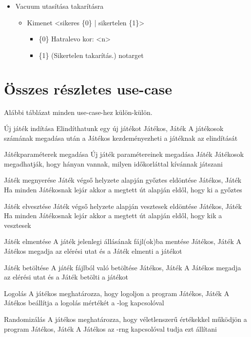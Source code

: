 \begin{itemize}
	\item Vacuum utasítása takarításra
	\begin{itemize}
		\item Kimenet <sikeres \{0\} | sikertelen \{1\}>
		\begin{itemize}
			\item \{0\} Hatralevo kor: <n>
			\item \{1\} (Sikertelen takarítás.) notarget
		\end{itemize}
	\end{itemize}
	
\end{itemize}


\section{Összes részletes use-case}
Alábbi táblázat minden use-case-hez külön-külön.

\usecase%
{Új játék indítása}%
{Elindíthatunk egy új játékot}%
{Játékos, Játék}%
{A játékosok számának megadása után a Játékos kezdeményezheti a játéknak az elindítását}

\usecase%
{Játékparaméterek megadása}%
{Új játék paramétereinek megadása}%
{Játék}%
{Játékosok megadhatják, hogy hányan vannak, milyen időkorláttal kívánnak játszani}

\usecase%
{Játék megnyerése}%
{Játék végső helyzete alapján győztes eldöntése}%
{Játékos, Játék}%
{Ha minden Játékosnak lejár akkor a megtett út alapján eldől, hogy ki a győztes}

\usecase%
{Játék elvesztése}%
{Játék végső helyzete alapján vesztesek eldöntése}%
{Játékos, Játék}%
{Ha minden Játékosnak lejár akkor a megtett út alapján eldől, hogy kik a vesztesek}

\usecase%
{Játék elmentése}
{A játék jelenlegi állásának fájl(ok)ba mentése}
{Játékos, Játék}
{A Játékos megadja az elérési utat és a Játék elmenti a játékot}

\usecase%
{Játék betöltése}
{A játék fájlból való betöltése}
{Játékos, Játék}
{A Játékos megadja az elérési utat és a Játék betölti a játékot}

\usecase%
{Logolás}
{A játékos meghatározza, hogy logoljon a program}
{Játékos, Játék}
{A Játékos beállítja a logolás mértékét a -log kapcsolóval}

\usecase%
{Randomizálás}
{A játékos meghatározza, hogy véletlenszerű értékekkel működjön a program}
{Játékos, Játék}
{A Játékos az -rng kapcsolóval tudja ezt állítani}


